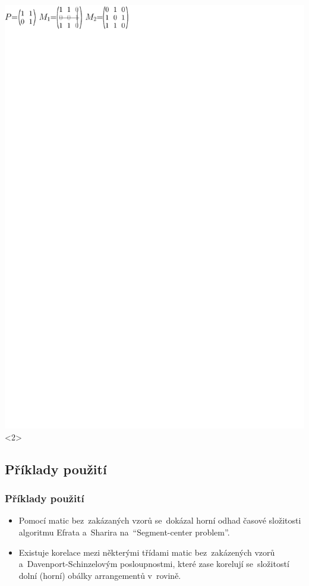 \documentclass{beamer}
\begin{document}
\begin{frame}
\includegraphics{../img/example2.pdf}<2>
\end{frame}

\subsection{Příklady použití}
\begin{frame}
\frametitle{Příklady použití}
\begin{itemize}
\setlength\itemsep{3mm}
\item Pomocí matic bez~zakázaných vzorů se~dokázal horní odhad časové složitosti algoritmu Efrata a~Sharira na~``Segment-center problem''.
\item Existuje korelace mezi některými třídami matic bez~zakázených vzorů a~Davenport-Schinzelovým posloupnostmi, které zase korelují se~složitostí dolní (horní) obálky arrangementů v~rovině.
\end{itemize}
\end{frame}
\end{document}

